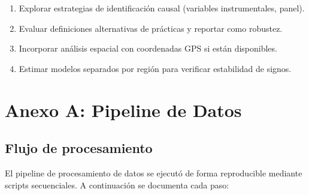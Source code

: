 \documentclass[11pt,a4paper]{article}
\begin{document}
\begin{enumerate}
    \item Explorar estrategias de identificación causal (variables instrumentales, panel).
    \item Evaluar definiciones alternativas de prácticas y reportar como robustez.
    \item Incorporar análisis espacial con coordenadas GPS si están disponibles.
    \item Estimar modelos separados por región para verificar estabilidad de signos.
\end{enumerate}

\section{Anexo A: Pipeline de Datos}

\subsection{Flujo de procesamiento}

El pipeline de procesamiento de datos se ejecutó de forma reproducible mediante scripts secuenciales. A continuación se documenta cada paso:
\end{document}

